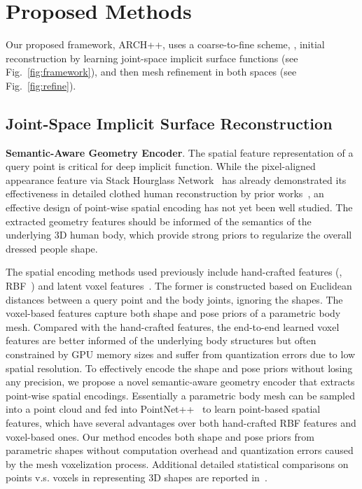 \documentclass[10pt,twocolumn,letterpaper]{article}
\newcommand{\beforesection}{\vspace{-1.5mm}}
\newcommand{\aftersection}{\vspace{-1.5mm}}
\newcommand{\beforesubsection}{\vspace{-1.5mm}}
\newcommand{\aftersubsection}{\vspace{-1.5mm}}
\begin{document}
\beforesection
\section{Proposed Methods} \label{sec:method}
\aftersection

Our proposed framework, ARCH++, uses a coarse-to-fine scheme,
\ie, initial reconstruction by learning joint-space implicit surface functions (see Fig.~\ref{fig:framework}), and then mesh refinement in both spaces (see Fig.~\ref{fig:refine}).

\beforesubsection
\subsection{Joint-Space Implicit Surface Reconstruction} \label{sec:model}
\aftersubsection

\textbf{Semantic-Aware Geometry Encoder}. The spatial feature representation of a query point is critical for deep implicit function. While the pixel-aligned appearance feature via Stack Hourglass Network~\cite{newell2016stacked} has already demonstrated its effectiveness in detailed clothed human reconstruction by prior works~\cite{PIFuICCV19,saito2020pifuhd,huang2020arch,he2020geopifu}, an effective design of point-wise spatial encoding has not yet been well studied. The extracted geometry features should be informed of the semantics of the underlying 3D human body, which provide strong priors to regularize the overall dressed people shape. 

The spatial encoding methods used previously include hand-crafted features (\eg, RBF~\cite{huang2020arch}) and latent voxel features~\cite{chibane20ifnet,he2020geopifu,Zerong2020PaMIR}. The former is constructed based on Euclidean distances between a query point and the body joints, ignoring the shapes. The voxel-based features capture both shape and pose priors of a parametric body mesh. Compared with the hand-crafted features, the end-to-end learned voxel features are better informed of the underlying body structures but often constrained by GPU memory sizes and suffer from quantization errors due to low spatial resolution. To effectively encode the shape and pose priors without losing any precision, we propose a novel semantic-aware geometry encoder that extracts point-wise spatial encodings. Essentially a parametric body mesh can be sampled into a point cloud and fed into PointNet++~\cite{qi2017pointnet,qi2017pointnet++} to learn point-based spatial features, which have several advantages over both hand-crafted RBF features and voxel-based ones. Our method encodes both shape and pose priors from parametric shapes without computation overhead and quantization errors caused by the mesh voxelization process. Additional detailed statistical comparisons on points v.s. voxels in representing 3D shapes are reported in~\cite{gabeur2019moulding}.
\end{document}
